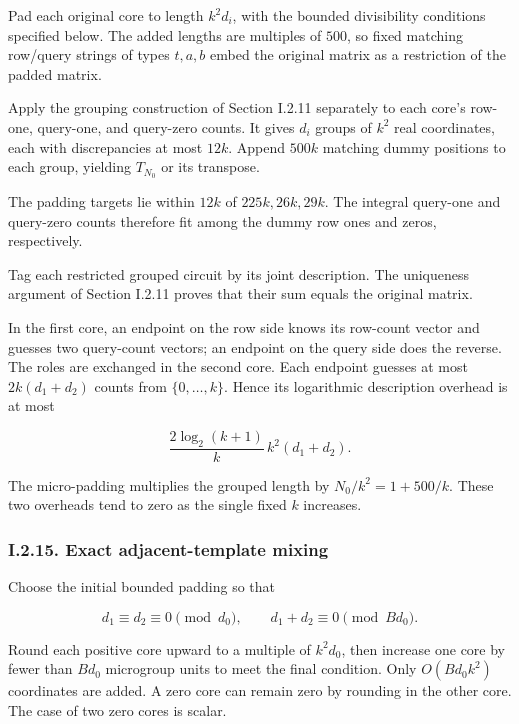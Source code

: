 Pad each original core to length \(k^2d_i\), with the bounded divisibility conditions specified below. The added lengths are multiples of \(500\), so fixed matching row/query strings of types \(t,a,b\) embed the original matrix as a restriction of the padded matrix.

Apply the grouping construction of Section I.2.11 separately to each core's row-one, query-one, and query-zero counts. It gives \(d_i\) groups of \(k^2\) real coordinates, each with discrepancies at most \(12k\). Append \(500k\) matching dummy positions to each group, yielding \(T_{N_0}\) or its transpose.

The padding targets lie within \(12k\) of \(225k,26k,29k\). The integral query-one and query-zero counts therefore fit among the dummy row ones and zeros, respectively.

Tag each restricted grouped circuit by its joint description. The uniqueness argument of Section I.2.11 proves that their sum equals the original matrix.

In the first core, an endpoint on the row side knows its row-count vector and guesses two query-count vectors; an endpoint on the query side does the reverse. The roles are exchanged in the second core. Each endpoint guesses at most \(2k(d_1+d_2)\) counts from \(\{0,\ldots,k\}\). Hence its logarithmic description overhead is at most

\[
\frac{2\log_2(k+1)}k\,k^2(d_1+d_2).
\tag{66}
\]

The micro-padding multiplies the grouped length by \(N_0/k^2=1+500/k\). These two overheads tend to zero as the single fixed \(k\) increases.

\hypertarget{af-a9ec399514-i.2.15.-exact-adjacent-template-mixing}{%
\subsubsection{I.2.15. Exact adjacent-template mixing}\label{af-a9ec399514-i.2.15.-exact-adjacent-template-mixing}}

Choose the initial bounded padding so that

\[
d_1\equiv d_2\equiv0\pmod{d_0},\qquad
d_1+d_2\equiv0\pmod{Bd_0}.
\]

Round each positive core upward to a multiple of \(k^2d_0\), then increase one core by fewer than \(Bd_0\) microgroup units to meet the final condition. Only \(O(Bd_0k^2)\) coordinates are added. A zero core can remain zero by rounding in the other core. The case of two zero cores is scalar.

